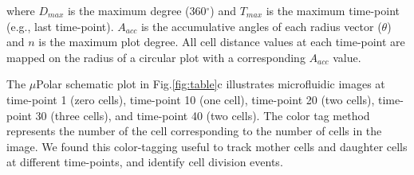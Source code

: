 \documentclass[conference]{IEEEtran}
\begin{document}
\noindent where $ D_{max} $ is the maximum degree (360$^{\circ}$) and  $ T_{max} $ is the maximum time-point (e.g., last time-point). $ A_{acc} $ is the accumulative angles of each radius vector ($\theta$) and $ n $ is the maximum plot degree. All cell distance values at each time-point are mapped on the radius of a circular plot with a corresponding $A_{acc}$ value.

The $\mu$Polar schematic plot in Fig.\ref{fig:table}c illustrates microfluidic images at time-point 1 (zero cells), time-point 10 (one cell), time-point 20 (two cells), time-point 30 (three cells), and time-point 40 (two cells). The color tag method represents the number of the cell corresponding to the number of cells in the image. We found this color-tagging useful to track mother cells and daughter cells at different time-points, and identify cell division events.



 
 
 
 
 
\end{document}

